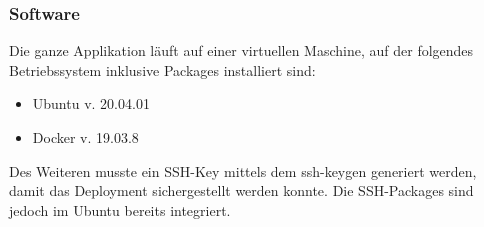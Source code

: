 \subsubsection{Software}
Die ganze Applikation läuft auf einer virtuellen Maschine, auf der folgendes Betriebssystem inklusive Packages installiert sind:
\begin{itemize}
    \item Ubuntu v. 20.04.01
    \item Docker v. 19.03.8
\end{itemize}
Des Weiteren musste ein SSH-Key mittels dem \glqq ssh-keygen\grqq{} generiert werden, damit das Deployment sichergestellt werden konnte.
Die SSH-Packages sind jedoch im Ubuntu bereits integriert.
\newpage